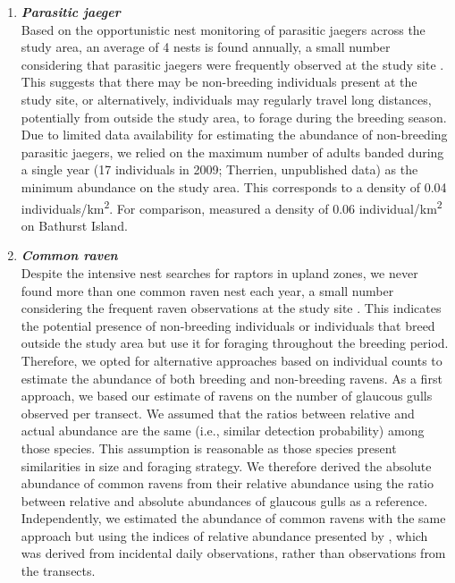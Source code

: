 \documentclass[a4paper,twoside,12pt]{article}
\begin{document}
\begin{enumerate}[label=\alph*.]
                \item[] \textit{\textbf{Parasitic jaeger}}\\
                Based on the opportunistic nest monitoring of parasitic jaegers across the study area, an average of 4 nests is found annually, a small number considering that parasitic jaegers were frequently observed at the study site \citep{gauthier2024a}. This suggests that there may be non-breeding individuals present at the study site, or alternatively, individuals may regularly travel long distances, potentially from outside the study area, to forage during the breeding season. Due to limited data availability for estimating the abundance of non-breeding parasitic jaegers, we relied on the maximum number of adults banded during a single year (17 individuals in 2009; Therrien, unpublished data) as the minimum abundance on the study area. This corresponds to a density of 0.04 individuals/km\textsuperscript{2}. For comparison, \citet{taylor1974} measured a density of 0.06 individual/km\textsuperscript{2} on Bathurst Island.
                
                \item[] \textit{\textbf{Common raven}}\\
                Despite the intensive nest searches for raptors in upland zones, we never found more than one common raven nest each year, a small number considering the frequent raven observations at the study site \citep{gauthier2024a}. This indicates the potential presence of non-breeding individuals or individuals that breed outside the study area but use it for foraging throughout the breeding period. Therefore, we opted for alternative approaches based on individual counts to estimate the abundance of both breeding and non-breeding ravens. 
As a first approach, we based our estimate of ravens on the number of glaucous gulls observed per transect. We assumed that the ratios between relative and actual abundance are the same (i.e., similar detection probability) among those species. This assumption is reasonable as those species present similarities in size and foraging strategy. We therefore derived the absolute abundance of common ravens from their relative abundance using the ratio between relative and absolute abundances of glaucous gulls as a reference.  
Independently, we estimated the abundance of common ravens with the same approach but using the indices of relative abundance presented by \citet{gauthier2024a}, which was derived from incidental daily observations, rather than observations from the transects.


\end{enumerate}
\end{document}
